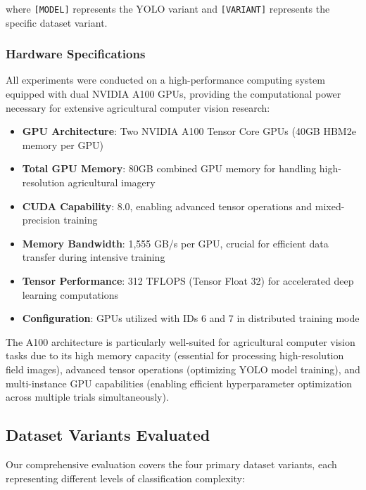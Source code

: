 where \texttt{[MODEL]} represents the YOLO variant and \texttt{[VARIANT]} represents the specific dataset variant.

\subsubsection{Hardware Specifications}

All experiments were conducted on a high-performance computing system equipped with dual NVIDIA A100 GPUs, providing the computational power necessary for extensive agricultural computer vision research:

\begin{itemize}
    \item \textbf{GPU Architecture}: Two NVIDIA A100 Tensor Core GPUs (40GB HBM2e memory per GPU)
    \item \textbf{Total GPU Memory}: 80GB combined GPU memory for handling high-resolution agricultural imagery
    \item \textbf{CUDA Capability}: 8.0, enabling advanced tensor operations and mixed-precision training
    \item \textbf{Memory Bandwidth}: 1,555 GB/s per GPU, crucial for efficient data transfer during intensive training
    \item \textbf{Tensor Performance}: 312 TFLOPS (Tensor Float 32) for accelerated deep learning computations
    \item \textbf{Configuration}: GPUs utilized with IDs 6 and 7 in distributed training mode
\end{itemize}

The A100 architecture is particularly well-suited for agricultural computer vision tasks due to its high memory capacity (essential for processing high-resolution field images), advanced tensor operations (optimizing YOLO model training), and multi-instance GPU capabilities (enabling efficient hyperparameter optimization across multiple trials simultaneously).

\subsection{Dataset Variants Evaluated}

Our comprehensive evaluation covers the four primary dataset variants, each representing different levels of classification complexity:

